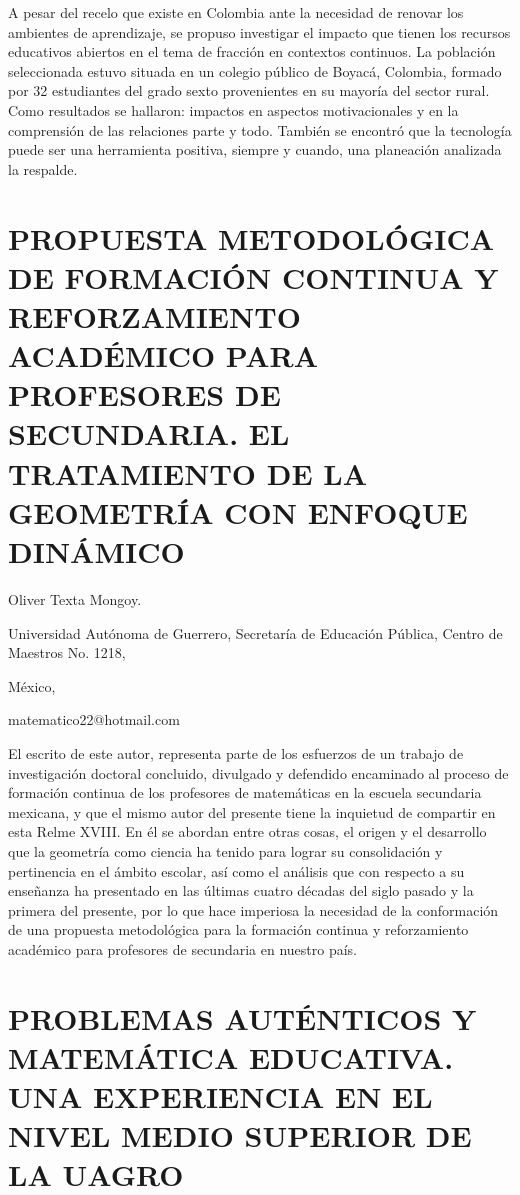 A pesar del recelo que existe en Colombia ante la necesidad de renovar
los ambientes de aprendizaje, se propuso investigar el impacto que
tienen los recursos educativos abiertos en el tema de fracción en
contextos continuos. La población seleccionada estuvo situada en un
colegio público de Boyacá, Colombia, formado por 32 estudiantes del
grado sexto provenientes en su mayoría del sector rural. Como resultados
se hallaron: impactos en aspectos motivacionales y en la comprensión
de las relaciones parte y todo. También se encontró que la tecnología
puede ser una herramienta positiva, siempre y cuando, una planeación
analizada la respalde.


\section{PROPUESTA METODOLÓGICA DE FORMACIÓN CONTINUA Y REFORZAMIENTO ACADÉMICO
PARA PROFESORES DE SECUNDARIA. EL TRATAMIENTO DE LA GEOMETRÍA CON
ENFOQUE DINÁMICO}

\begin{datos}

Oliver Texta Mongoy.

Universidad Autónoma de Guerrero, Secretaría de Educación Pública,
Centro de Maestros No. 1218,

México,

matematico22@hotmail.com 

\end{datos}

El escrito de este autor, representa parte de los esfuerzos de un
trabajo de investigación doctoral concluido, divulgado y defendido
encaminado al proceso de formación continua de los profesores de matemáticas
en la escuela secundaria mexicana, y que el mismo autor del presente
tiene la inquietud de compartir en esta Relme XVIII. En él se abordan
entre otras cosas, el origen y el desarrollo que la geometría como
ciencia ha tenido para lograr su consolidación y pertinencia en el
ámbito escolar, así como el análisis que con respecto a su enseñanza
ha presentado en las últimas cuatro décadas del siglo pasado y la
primera del presente, por lo que hace imperiosa la necesidad de la
conformación de una propuesta metodológica para la formación continua
y reforzamiento académico para profesores de secundaria en nuestro
país. 


\section{PROBLEMAS AUTÉNTICOS Y MATEMÁTICA EDUCATIVA. UNA EXPERIENCIA EN EL
NIVEL MEDIO SUPERIOR DE LA UAGRO}

